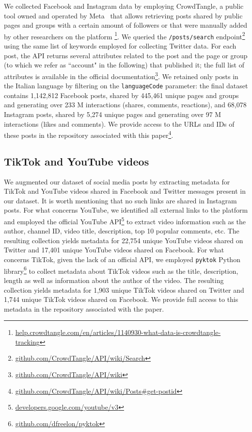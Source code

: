 \documentclass[sigconf,screen]{acmart}
\begin{document}
We collected Facebook and Instagram data by employing CrowdTangle, a public tool owned and operated by Meta~\cite{crowdtangle} that allows retrieving posts shared by public pages and groups with a certain amount of followers or that were manually added by other researchers on the platform \footnote{\url{help.crowdtangle.com/en/articles/1140930-what-data-is-crowdtangle-tracking}}. We queried the \texttt{/posts/search} endpoint\footnote{\url{github.com/CrowdTangle/API/wiki/Search}} using the same list of keywords employed for collecting Twitter data. For each post, the API returns several attributes related to the post and the page or group (to which we refer as ``account" in the following) that published it; the full list of attributes is available in the official documentation\footnote{\url{github.com/CrowdTangle/API/wiki}}. We retained only posts in the Italian language by filtering on the \texttt{languageCode} parameter: the final dataset contains 1,142,812 Facebook posts, shared by 445,461 unique pages and groups and generating over 233 M interactions (shares, comments, reactions), and 68,078 Instagram posts, shared by 5,274 unique pages and generating over 97 M interactions (likes and comments). 
We provide access to the URLs and IDs of these posts in the repository associated with this paper\footnote{\url{github.com/CrowdTangle/API/wiki/Posts\#get-postid}}.


\subsection{TikTok and YouTube videos}

We augmented our dataset of social media posts by extracting metadata for TikTok and YouTube videos shared in Facebook and Twitter messages present in our dataset.  It is worth mentioning that no such links are shared in Instagram posts. For what concerns YouTube, we identified all external links to the platform and employed the official YouTube API\footnote{\url{developers.google.com/youtube/v3}} to extract video information such as the author, channel ID, video title, description, top 10 popular comments, etc. The resulting collection yields metadata for 22,754 unique YouTube videos shared on Twitter and 17,401 unique YouTube videos shared on Facebook. For what concerns TikTok, given the lack of an official API, we employed \texttt{pyktok} Python library\footnote{\url{github.com/dfreelon/pyktok}} to collect metadata about TikTok videos such as the title, description, length as well as information about the author of the video.
The resulting collection yields metadata for 1,903 unique TikTok videos shared on Twitter and 1,744 unique TikTok videos shared on Facebook. We provide full access to this metadata in the repository associated with the paper.
\end{document}

